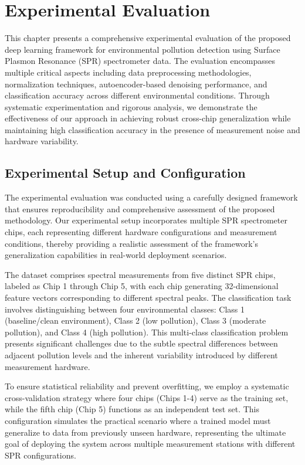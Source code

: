 \chapter{Experimental Evaluation}
\label{ch:experimental_evaluation}

This chapter presents a comprehensive experimental evaluation of the proposed deep learning framework for environmental pollution detection using Surface Plasmon Resonance (SPR) spectrometer data. The evaluation encompasses multiple critical aspects including data preprocessing methodologies, normalization techniques, autoencoder-based denoising performance, and classification accuracy across different environmental conditions. Through systematic experimentation and rigorous analysis, we demonstrate the effectiveness of our approach in achieving robust cross-chip generalization while maintaining high classification accuracy in the presence of measurement noise and hardware variability.

\section{Experimental Setup and Configuration}
\label{sec:experimental_setup}

The experimental evaluation was conducted using a carefully designed framework that ensures reproducibility and comprehensive assessment of the proposed methodology. Our experimental setup incorporates multiple SPR spectrometer chips, each representing different hardware configurations and measurement conditions, thereby providing a realistic assessment of the framework's generalization capabilities in real-world deployment scenarios.

The dataset comprises spectral measurements from five distinct SPR chips, labeled as Chip 1 through Chip 5, with each chip generating 32-dimensional feature vectors corresponding to different spectral peaks. The classification task involves distinguishing between four environmental classes: Class 1 (baseline/clean environment), Class 2 (low pollution), Class 3 (moderate pollution), and Class 4 (high pollution). This multi-class classification problem presents significant challenges due to the subtle spectral differences between adjacent pollution levels and the inherent variability introduced by different measurement hardware.

To ensure statistical reliability and prevent overfitting, we employ a systematic cross-validation strategy where four chips (Chips 1-4) serve as the training set, while the fifth chip (Chip 5) functions as an independent test set. This configuration simulates the practical scenario where a trained model must generalize to data from previously unseen hardware, representing the ultimate goal of deploying the system across multiple measurement stations with different SPR configurations.

